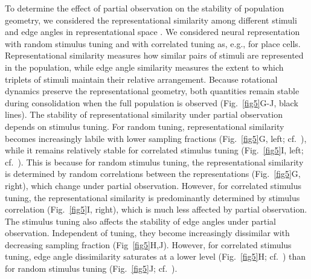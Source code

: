To determine the effect of partial observation on the stability of population geometry, we considered the representational similarity among different stimuli \citep{Deitch2021} and edge angles in representational space \citep{Schoonover2021,Sylte2025}. We considered neural representation with random stimulus tuning and with correlated tuning as, e.g., for place cells. %
Representational similarity measures how similar pairs of stimuli are represented in the population, while edge angle similarity measures the extent to which triplets of stimuli maintain their relative arrangement. %
Because rotational dynamics preserve the representational geometry, both quantities remain stable during consolidation when the full population is observed (Fig.~\ref{fig5}G-J, black lines). The stability of representational similarity under partial observation depends on stimulus tuning. For random tuning, representational similarity becomes increasingly labile with lower sampling fractions (Fig.~\ref{fig5}G, left; cf.~\citet{Schoonover2021}), while it remains relatively stable for correlated stimulus tuning (Fig.~\ref{fig5}I, left; cf.~\citet{Deitch2021}). This is because for random stimulus tuning, the representational similarity is determined by random correlations between the representations (Fig.~\ref{fig5}G, right), which change under partial observation. However, for correlated stimulus tuning, the representational similarity is predominantly determined by stimulus correlation (Fig.~\ref{fig5}I, right), which is much less affected by partial observation. The stimulus tuning also affects the stability of edge angles under partial observation. Independent of tuning, they become increasingly dissimilar with decreasing sampling fraction (Fig~\ref{fig5}H,J). However, for correlated stimulus tuning, edge angle dissimilarity saturates at a lower level (Fig.~\ref{fig5}H; cf.~\citet{Sylte2025}) than for random stimulus tuning (Fig.~\ref{fig5}J; cf.~\citet{Schoonover2021}).

